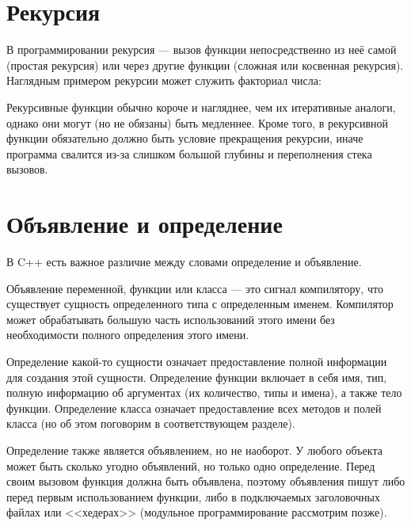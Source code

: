 \documentclass[book.tex]{subfiles}
\begin{document}

\section*{Рекурсия}


В программировании рекурсия --- вызов функции непосредственно из неё самой (простая рекурсия) или через другие функции (сложная или косвенная рекурсия). Наглядным примером рекурсии может служить факториал числа:


Рекурсивные функции обычно короче и нагляднее, чем их итеративные аналоги, однако они могут (но не обязаны) быть медленнее. Кроме того, в рекурсивной функции обязательно должно быть условие прекращения рекурсии, иначе программа свалится из-за слишком большой глубины и переполнения стека вызовов.

\section*{Объявление и определение}

В C++ есть важное различие между словами определение и объявление. 

Объявление переменной, функции или класса --- это сигнал компилятору, что существует сущность определенного типа с определенным именем. Компилятор может обрабатывать большую часть использований этого имени без необходимости полного определения этого имени.

Определение какой-то сущности означает предоставление полной информации для создания этой сущности. Определение функции включает в себя имя, тип, полную информацию об аргументах (их количество, типы и имена), а также тело функции. Определение класса означает предоставление всех методов и полей класса (но об этом поговорим в соответствующем разделе).

Определение также является объявлением, но не наоборот. У любого объекта может быть сколько угодно объявлений, но только одно определение. Перед своим вызовом функция должна быть объявлена, поэтому объявления пишут либо перед первым использованием функции, либо в подключаемых заголовочных файлах или <<хедерах>> (модульное программирование рассмотрим позже).
\end{document}
